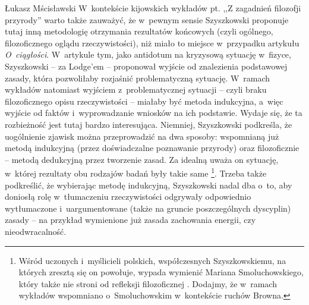 \begin{artplenv}{Łukasz Mścisławski}
W~kontekście kijowskich wykładów pt. ,,Z zagadnień filozofji przyrody'' warto także zauważyć, że w~pewnym sensie Szyszkowski proponuje tutaj inną metodologię otrzymania rezultatów końcowych (czyli ogólnego, filozoficznego oglądu rzeczywistości), niż miało to miejsce w~przypadku artykułu \textit{O~ciągłości}. W~artykule tym, jako antidotum na kryzysową sytuację w~fizyce, Szyszkowski -- za Lodge'em -- proponował wyjście od znalezienia podstawowej zasady, która pozwoliłaby rozjaśnić problematyczną sytuację. W~ramach wykładów natomiast wyjściem z~problematycznej sytuacji -- czyli braku filozoficznego opisu rzeczywistości -- miałaby być metoda indukcyjna, a~więc wyjście od faktów i~wyprowadzanie wniosków na ich podstawie. Wydaje się, że ta rozbieżność jest tutaj bardzo interesująca. Niemniej, Szyszkowski podkreśla, że uogólnienie zjawisk można przeprowadzić na dwa sposoby: wspomnianą już metodą indukcyjną (przez doświadczalne poznawanie przyrody) oraz filozoficznie -- metodą dedukcyjną przez tworzenie zasad. Za idealną uważa on sytuację, w~której rezultaty obu rodzajów badań były takie same
\parencite[por. ][k. 212r-212v]{noauthor_noty_1917}%
 \footnote{Wśród uczonych i~myślicieli polskich, współczesnych Szyszkowskiemu, na których zresztą się on powołuje, wypada wymienić Mariana Smoluchowskiego, który także nie stroni od refleksji filozoficznej 
\parencite[por. np.][]{dziekan_zagadnienie_2017}. %
 Dodajmy, że w~ramach wykładów wspomniano o~Smoluchowskim w~kontekście ruchów Browna.}. Trzeba także podkreślić, że wybierając metodę indukcyjną, Szyszkowski nadal dba o~to, aby doniosłą rolę w~tłumaczeniu rzeczywistości odgrywały odpowiednio wytłumaczone i~uargumentowane (także na gruncie poszczególnych dyscyplin) zasady -- na przykład wymienione już zasada zachowania energii, czy nieodwracalność.


\end{artplenv}
